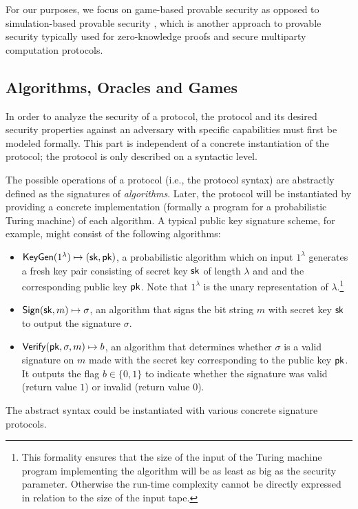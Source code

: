 For our purposes, we focus on game-based provable security
\cite{bellare2006code,pointcheval2005provable,shoup2004sequences,guo2018introduction}
as opposed to simulation-based provable security \cite{goldwasser1989knowledge,lindell2017simulate},
which is another approach to provable security typically used for
zero-knowledge proofs and secure multiparty computation protocols.

\subsection{Algorithms, Oracles and Games}
In order to analyze the security of a protocol, the protocol and its desired
security properties against an adversary with specific capabilities must first
be modeled formally.  This part is independent of a concrete instantiation of
the protocol; the protocol is only described on a syntactic level.

The possible operations of a protocol (i.e., the protocol syntax) are abstractly
defined as the signatures of \emph{algorithms}.  Later, the protocol will be
instantiated by providing a concrete implementation (formally a program for a
probabilistic Turing machine) of each algorithm. A typical public key signature
scheme, for example, might consist of the following algorithms:
\begin{itemize}
  \item $\mathsf{KeyGen}(1^\lambda) \mapsto (\mathsf{sk}, \mathsf{pk})$, a probabilistic algorithm
    which on input $1^\lambda$ generates a fresh key pair consisting of secret key $\mathsf{sk}$ of length $\lambda$ and
    and the corresponding public key $\mathsf{pk}$.  Note that $1^\lambda$ is the unary representation of $\lambda$.\footnote{%
    This formality ensures that the size of the input of the Turing machine program implementing the algorithm will
    be as least as big as the security parameter.  Otherwise the run-time complexity cannot be directly expressed
    in relation to the size of the input tape.}
  \item $\mathsf{Sign}(\mathsf{sk}, m) \mapsto \sigma$, an algorithm
    that signs the bit string $m$ with secret key $\mathsf{sk}$ to output the signature $\sigma$.
  \item $\mathsf{Verify}(\mathsf{pk}, \sigma, m) \mapsto b$, an algorithm
    that determines whether $\sigma$ is a valid signature on $m$ made with the secret key corresponding to the
    public key $\mathsf{pk}$.  It outputs the flag $b \in \{0, 1\}$ to indicate whether the signature
    was valid (return value $1$) or invalid (return value $0$).
\end{itemize}
The abstract syntax could be instantiated with various concrete signature protocols.

